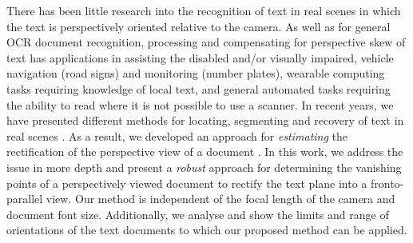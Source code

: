 \documentclass{elsart}   %
\begin{document}
There has been little research into the recognition of text in real scenes in
which the text is perspectively oriented relative to the camera.  As well as for
general OCR document recognition, processing and compensating for perspective
skew of text has applications in assisting the disabled and/or visually
impaired, vehicle navigation (road signs) and monitoring (number plates), wearable
computing tasks requiring knowledge of local text, and general automated tasks
requiring the ability to read where it is not possible to use a scanner. In
recent years, we have presented different methods for locating, segmenting and
recovery of text in real scenes
\cite{joey1,ClarkICPR2000,2001-clark,justin,clark-ijdar-2001}. As a result, we
developed an approach for {\em estimating} the rectification of the perspective
view of a document \cite{2001-clark,clark-ijdar-2001}. In this work, we address
the issue in more depth and present a {\em robust} approach for determining the
vanishing points of a perspectively viewed document to rectify the text plane
into a fronto-parallel view. Our method is independent of the focal length of
the camera and document font size. Additionally, we analyse and show the limits
and range of orientations of the text documents to which our proposed method can
be applied.


\end{document}
